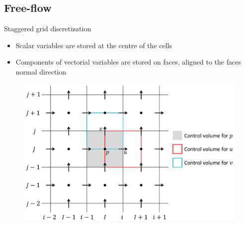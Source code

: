 \documentclass{beamer}
\begin{document}
\subsection*{Free-flow}
\begin{frame}{Staggered grid discretization}
\begin{itemize}
	\item Scalar variables are stored at the centre of the 
	cells
	\item Components of vectorial variables are stored on faces, aligned to the 
	faces normal direction
\end{itemize}
\begin{figure}
	\centering
	\includegraphics[trim={2cm 1cm 0cm 0cm}, clip, 
	height=0.65\textheight]{staggered_grid_mia.pdf}
\end{figure}
\end{frame}
\end{document}
